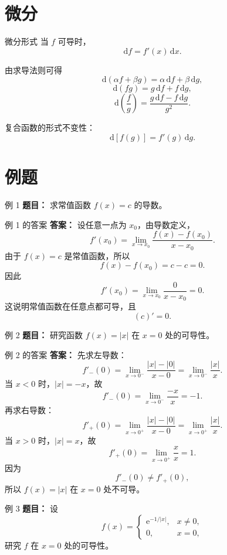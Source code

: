 ﻿\documentclass[aspectratio=169,11pt]{ctexbeamer}
\newcommand{\e}{\mathrm{e}}
\newcommand{\dx}{\,\mathrm{d}x}
\begin{document}
\section{微分}

\begin{frame}{微分形式}
当 $f$ 可导时，
\[
\mathrm{d}f=f'(x)\dx.
\]

由求导法则可得
\[
\mathrm{d}(\alpha f+\beta g)=\alpha\,\mathrm{d}f+\beta\,\mathrm{d}g,
\]
\[
\mathrm{d}(fg)=g\,\mathrm{d}f+f\,\mathrm{d}g,
\]
\[
\mathrm{d}\!\left(\frac{f}{g}\right)=\frac{g\,\mathrm{d}f-f\,\mathrm{d}g}{g^2}.
\]

复合函数的形式不变性：
\[
\mathrm{d}[f(g)]=f'(g)\,\mathrm{d}g.
\]
\end{frame}

\section{例题}

\begin{frame}{例 1}
\small
\textbf{题目：} 求常值函数 $f(x)=c$ 的导数。
\end{frame}

\begin{frame}{例 1 的答案}
\small
\textbf{答案：} 设任意一点为 $x_0$，由导数定义，
\[
f'(x_0)=\lim_{x\to x_0}\frac{f(x)-f(x_0)}{x-x_0}.
\]
由于 $f(x)=c$ 是常值函数，所以
\[
f(x)-f(x_0)=c-c=0.
\]
因此
\[
f'(x_0)=\lim_{x\to x_0}\frac{0}{x-x_0}=0.
\]
这说明常值函数在任意点都可导，且
\[
(c)'=0.
\]
\end{frame}

\begin{frame}{例 2}
\small
\textbf{题目：} 研究函数 $f(x)=|x|$ 在 $x=0$ 处的可导性。
\end{frame}

\begin{frame}{例 2 的答案}
\small
\textbf{答案：} 先求左导数：
\[
f'_-(0)=\lim_{x\to 0^-}\frac{|x|-|0|}{x-0}
=\lim_{x\to 0^-}\frac{|x|}{x}.
\]
当 $x<0$ 时，$|x|=-x$，故
\[
f'_-(0)=\lim_{x\to 0^-}\frac{-x}{x}=-1.
\]
再求右导数：
\[
f'_+(0)=\lim_{x\to 0^+}\frac{|x|-|0|}{x-0}
=\lim_{x\to 0^+}\frac{|x|}{x}.
\]
当 $x>0$ 时，$|x|=x$，故
\[
f'_+(0)=\lim_{x\to 0^+}\frac{x}{x}=1.
\]
因为
\[
f'_-(0)\neq f'_+(0),
\]
所以 $f(x)=|x|$ 在 $x=0$ 处不可导。
\end{frame}

\begin{frame}{例 3}
\small
\textbf{题目：} 设
\[
f(x)=
\begin{cases}
\e^{-1/|x|}, & x\neq 0,\\
0, & x=0,
\end{cases}
\]
研究 $f$ 在 $x=0$ 处的可导性。
\end{frame}
\end{document}
